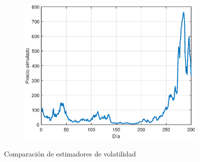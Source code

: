 \begin{figure}[H]
\begin{subfigure}[b]{0.45\linewidth}
        \includegraphics[width=\linewidth]{Imagenes/Parte1/7_Volatilidad/Accion.eps}
    \end{subfigure}
    \caption{Comparación de estimadores de volatilidad}
\end{figure}



